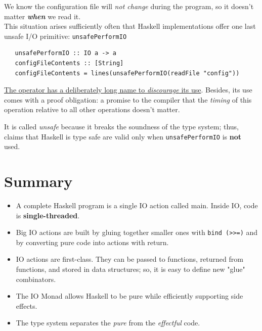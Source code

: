 We know the configuration file will \textit{not change}
during the program, so it doesn’t matter \textit{\textbf{when}} we
read it.\\
This situation arises sufficiently often that Haskell
implementations offer one last unsafe I/O primitive:
\lstinline|unsafePerformIO|
\begin{lstlisting}
   unsafePerformIO :: IO a -> a
   configFileContents :: [String]
   configFileContents = lines(unsafePerformIO(readFile "config"))
\end{lstlisting}

\ul{The operator has a deliberately long name to
\textit{discourage} its use}.
Besides, its use comes with a proof obligation:
a promise to the compiler that the \textit{timing} of this operation
relative to all other operations doesn’t matter.

It is called \textit{unsafe} because it breaks the soundness of the type system;
thus, claims that Haskell is type safe are valid only when \lstinline|unsafePerformIO| is \textbf{not} used.

\section{Summary}
\begin{itemize}
   \item A complete Haskell program is a single IO action called
   main. Inside IO, code is \textbf{single-threaded}.
   \item Big IO actions are built by gluing together smaller ones with
   \lstinline|bind (>>=)| and by converting pure code into actions with
   return.
   \item IO actions are first-class.
   They can be passed to functions, returned from functions, and
   stored in data structures; so, it is easy to define new "glue" combinators.
   \item The IO Monad allows Haskell to be pure while efficiently
   supporting side effects.
   \item The type system separates the \textit{pure} from the \textit{effectful} code.
\end{itemize}

